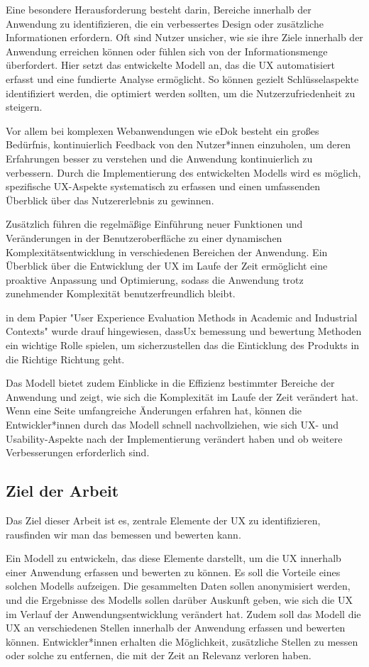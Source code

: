 \documentclass[12pt,oneside]{article}
\begin{document}
Eine besondere Herausforderung besteht darin, Bereiche innerhalb der Anwendung zu identifizieren, die ein verbessertes Design oder zusätzliche Informationen erfordern. Oft sind Nutzer unsicher, wie sie ihre Ziele innerhalb der Anwendung erreichen können oder fühlen sich von der Informationsmenge überfordert. Hier setzt das entwickelte Modell an, das die UX automatisiert erfasst und eine fundierte Analyse ermöglicht. So können gezielt Schlüsselaspekte identifiziert werden, die optimiert werden sollten, um die Nutzerzufriedenheit zu steigern.

Vor allem bei komplexen Webanwendungen wie eDok besteht ein großes Bedürfnis, kontinuierlich Feedback von den Nutzer*innen einzuholen, um deren Erfahrungen besser zu verstehen und die Anwendung kontinuierlich zu verbessern. Durch die Implementierung des entwickelten Modells wird es möglich, spezifische UX-Aspekte systematisch zu erfassen und einen umfassenden Überblick über das Nutzererlebnis zu gewinnen.

Zusätzlich führen die regelmäßige Einführung neuer Funktionen und Veränderungen in der Benutzeroberfläche zu einer dynamischen Komplexitätsentwicklung
 in verschiedenen Bereichen der Anwendung. Ein Überblick über die Entwicklung der UX im Laufe der Zeit ermöglicht eine proaktive Anpassung und Optimierung, 
sodass die Anwendung trotz zunehmender Komplexität benutzerfreundlich bleibt.

in dem Papier "User Experience Evaluation Methods in Academic and
Industrial Contexts" wurde drauf hingewiesen, dassUx bemessung und bewertung Methoden 
 ein wichtige Rolle spielen, um sicherzustellen das die Einticklung des Produkts in die Richtige Richtung geht.\cite{Virpi}

Das Modell bietet zudem Einblicke in die Effizienz bestimmter Bereiche der Anwendung und zeigt, wie sich die Komplexität im Laufe der Zeit verändert hat. Wenn eine Seite umfangreiche Änderungen erfahren hat, können die Entwickler*innen durch das Modell schnell nachvollziehen, wie sich UX- und Usability-Aspekte nach der Implementierung verändert haben und ob weitere Verbesserungen erforderlich sind.
\subsection{Ziel der Arbeit}
Das Ziel dieser Arbeit ist es, zentrale Elemente der UX zu identifizieren, rausfinden wir man das bemessen und bewerten kann. 

Ein Modell zu entwickeln, das diese Elemente darstellt, um die UX innerhalb einer Anwendung erfassen und bewerten zu können. Es soll die Vorteile eines solchen Modells aufzeigen.
Die gesammelten Daten sollen anonymisiert werden, und die Ergebnisse des Modells sollen darüber Auskunft geben, wie sich die UX im Verlauf der Anwendungsentwicklung verändert hat. Zudem soll das Modell die UX an verschiedenen Stellen innerhalb der Anwendung erfassen und bewerten können. Entwickler*innen erhalten die Möglichkeit, zusätzliche Stellen zu messen oder solche zu entfernen, die mit der Zeit an Relevanz verloren haben.
\end{document}
